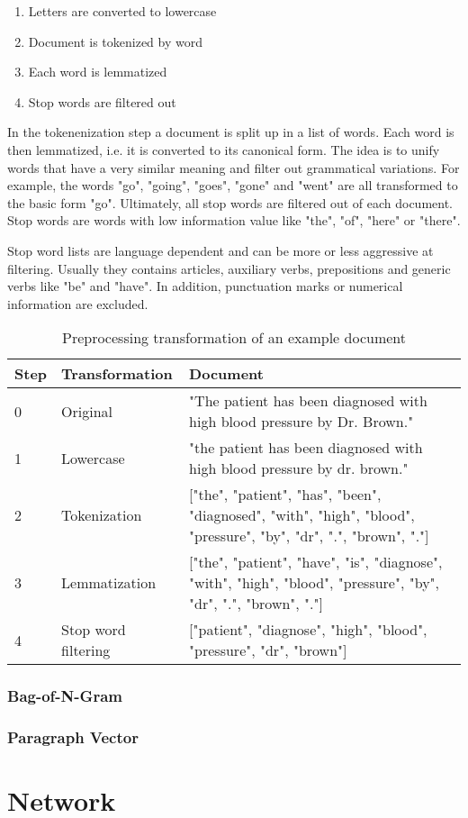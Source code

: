 \begin{enumerate} 
	\item Letters are converted to lowercase
	\item Document is tokenized by word
	\item Each word is lemmatized
	\item Stop words are filtered out
\end{enumerate}

In the tokenenization step a document is split up in a list of words.
Each word is then lemmatized, i.e. it is converted to its canonical form.
The idea is to unify words that have a very similar meaning and filter out grammatical variations.
For example, the words  "go", "going", "goes", "gone" and "went" are all transformed to the basic form "go".
Ultimately, all stop words are filtered out of each document.
Stop words are words with low information value like "the", "of", "here" or "there".

Stop word lists are language dependent and can be more or less aggressive at filtering.
Usually they contains articles, auxiliary verbs, prepositions and generic verbs like "be" and "have".
In addition, punctuation marks or numerical information are excluded.

\begin{table}[]
	\begin{tabularx}{\textwidth}{l l p{9.8cm}}
		\toprule
		\textbf{Step} & \textbf{Transformation} & \textbf{Document}                                                       \\ \midrule
		0             & Original       & "The patient has been diagnosed with high blood pressure by Dr. Brown." \\
		1             & Lowercase               & "the patient has been diagnosed with high blood pressure by dr. brown." \\
		2 & Tokenization  & {[}"the", "patient", "has", "been", "diagnosed", "with", "high", "blood", "pressure", "by", "dr", ".", "brown", "."{]} \\
		3 & Lemmatization & {[}"the", "patient", "have", "is", "diagnose", "with", "high", "blood", "pressure", "by", "dr", ".", "brown", "."{]}   \\
		4             & Stop word filtering     & {[}"patient", "diagnose", "high", "blood", "pressure", "dr", "brown"{]} \\ \bottomrule
	\end{tabularx}
	\caption{Preprocessing transformation of an example document}
	\label{tab:text-preprocessing}
\end{table}








\subsubsection{Bag-of-N-Gram}
\subsubsection{Paragraph Vector}

\section{Network}